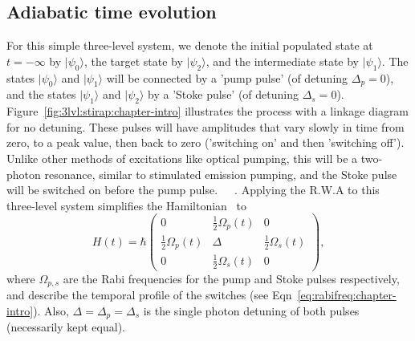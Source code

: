 \subsection{Adiabatic time evolution}
For this simple three-level system, we denote the initial populated state at $t=-\infty$ by $|\psi_0\rangle$, the target state by $|\psi_2\rangle$, and the intermediate state by $|\psi_1\rangle$. The states  $|\psi_0\rangle$ and  $|\psi_1\rangle$ will be connected by a 'pump pulse' (of detuning $\Delta_p=0$), and the states  $|\psi_1\rangle$ and  $|\psi_2\rangle$ by a 'Stoke pulse' (of detuning $\Delta_s=0$). Figure~\ref{fig:3lvl:stirap:chapter-intro} illustrates the process with a linkage diagram for no detuning.
These pulses will have amplitudes that vary slowly in time from zero, to a peak value, then back to zero ('switching on' and then 'switching off'). Unlike other methods of excitations like optical pumping, this will be a two-photon resonance, similar to stimulated emission pumping, and the Stoke pulse will be switched on before the pump pulse.~\cite{stirap:hioe}~\cite{stirap:theory}~\cite{stirap:review}. Applying the R.W.A to this three-level system simplifies the Hamiltonian~\cite{hioe:rwa:stirap} to
\begin{equation}
H(t)=\hbar \left(
\begin{array}{ccc}
0 & \frac{1}{2}\Omega_p(t) & 0 \\
 \frac{1}{2}\Omega_p(t) & \Delta  & \frac{1}{2}\Omega_s(t)\\
 0 &  \frac{1}{2}\Omega_s(t) & 0
\end{array}
\right),
\label{eq:3lvl:stirap:hamilt:chapter-intro}
\end{equation}
where  $\Omega_{p,s}$  are the Rabi frequencies for the pump and Stoke pulses respectively, and describe the temporal profile of the switches (see Eqn~\ref{eq:rabifreq:chapter-intro}). Also, $\Delta=\Delta_p=\Delta_s$ is the single photon detuning of both pulses (necessarily kept equal). 

